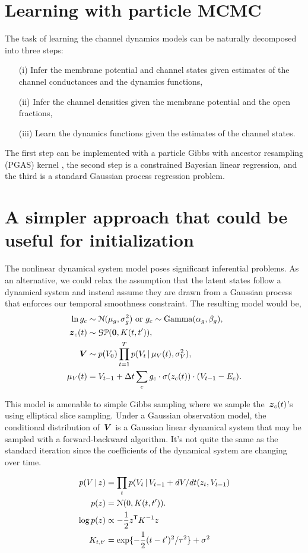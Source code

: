 \documentclass[aos]{imsart} %
\begin{document}
\section{Learning with particle MCMC} 
The task of learning the channel dynamics models can be naturally decomposed into three steps: 
\begin{enumerate}
\item[(i)] Infer the membrane potential and channel states given estimates of the channel conductances and the dynamics functions,
\item[(ii)] Infer the channel densities given the membrane potential and the open fractions, 
\item[(iii)] Learn the dynamics functions given the estimates of the channel states.
\end{enumerate}

The first step can be implemented with a particle Gibbs with ancestor resampling (PGAS) kernel \cite{Lindsten-2014}, the second step is a constrained Bayesian linear regression, and the third is a standard Gaussian process regression problem. 


{\small }

\clearpage

\appendix
\section{A simpler approach that could be useful for initialization}
The nonlinear dynamical system model poses significant inferential problems. As an alternative, we could relax the assumption that the latent states follow a dynamical system and instead assume they are drawn from a Gaussian process that enforces our temporal smoothness constraint. The resulting model would be,
\begin{align*}
\ln g_c &\sim \distNormal(\mu_g, \sigma_g^2) \text{ or } g_c \sim \distGamma(\alpha_g, \beta_g), \\
\bz_c(t) &\sim \mathcal{GP}(\boldsymbol{0}, K(t,t')), \\
\bV &\sim p(V_0) \prod_{t=1}^T p(V_t \given \mu_V(t), \sigma_V^2), \\
\mu_V(t) &= V_{t-1} + \Delta t \sum_{c} g_c \cdot \sigma(z_c(t)) \cdot (V_{t-1}-E_c).
\end{align*}

This model is amenable to simple Gibbs sampling where we sample the~$\boldsymbol{z}_c(t)$'s using elliptical slice sampling. Under a Gaussian observation model, the conditional distribution of~$\boldsymbol{V}$ is a Gaussian linear dynamical system that may be sampled with a forward-backward algorithm. It's not quite the same as the standard iteration since the coefficients of the dynamical system are changing over time. 

\begin{align}
p(V \given z) &= \prod_t p(V_t \given V_{t-1} +  dV/dt(z_t, V_{t-1}) \\
p(z) &= \distNormal(0, K(t,t')). \\
\log p(z) &\propto -\frac{1}{2} z^\trans K^{-1} z  \\
K_{t,t'} &= \exp\{-\frac{1}{2} (t-t')^2/\tau^2 \} + \sigma^2 
\end{align}
\end{document}
